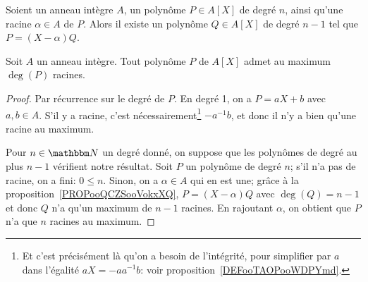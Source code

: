 \begin{proposition}     \label{PROPooQCZSooVokxXQ}
    Soient un anneau intègre \( A\), un polynôme \( P\in A[X]\) de degré \( n\), ainsi qu'une racine \( \alpha\in A\) de \( P\). Alors il existe un polynôme \( Q\in A[X]\) de degré \( n-1\) tel que \( P=(X-\alpha)Q\).
\end{proposition}

\begin{theorem}   \label{THM_racinesPoly}
  Soit \( A \) un anneau intègre. Tout polynôme \( P \) de \( A[X] \) admet au maximum \( \deg(P) \) racines.
\end{theorem}

\begin{proof}
  Par récurrence sur le degré de \(P \). En degré 1, on a \( P = aX + b \) avec \( a, b \in A \). S'il y a racine, c'est nécessairement\footnote{Et c'est précisément là qu'on a besoin de l'intégrité, pour simplifier par \( a \) dans l'égalité \( aX = - aa^{-1}b \): voir proposition~\ref{DEFooTAOPooWDPYmd}.} \( - a^{-1} b \), et donc il n'y a bien qu'une racine au maximum.
  
  Pour \( n \in \eN \) un degré donné, on suppose que les polynômes de degré au plus \(n-1\) vérifient notre résultat. Soit \( P \) un polynôme de degré \( n \); s'il n'a pas de racine, on a fini: \( 0 \leq n \). Sinon, on a \( \alpha \in A \) qui en est une; grâce à la proposition~\ref{PROPooQCZSooVokxXQ}, \( P = (X - \alpha) Q \) avec \( \deg(Q) = n-1 \) et donc \(Q \) n'a qu'un maximum de \( n-1 \) racines. En rajoutant \( \alpha \), on obtient que \( P \) n'a que \(n \) racines au maximum.
\end{proof}
